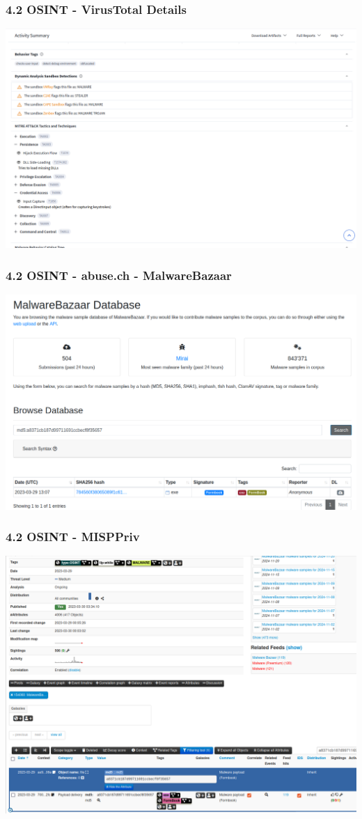 \begin{frame}[fragile]
  \frametitle{4.2 OSINT - VirusTotal Details}
  \includegraphics[scale=0.24]{images/VT_2.png}
\end{frame}


\begin{frame}[fragile]
  \frametitle{4.2 OSINT - abuse.ch - MalwareBazaar}
  \includegraphics[scale=0.24]{images/mwBazaar.png}
\end{frame}


\begin{frame}[fragile]
  \frametitle{4.2 OSINT - MISPPriv}
  \includegraphics[scale=0.22]{images/misp.png}
\end{frame}


